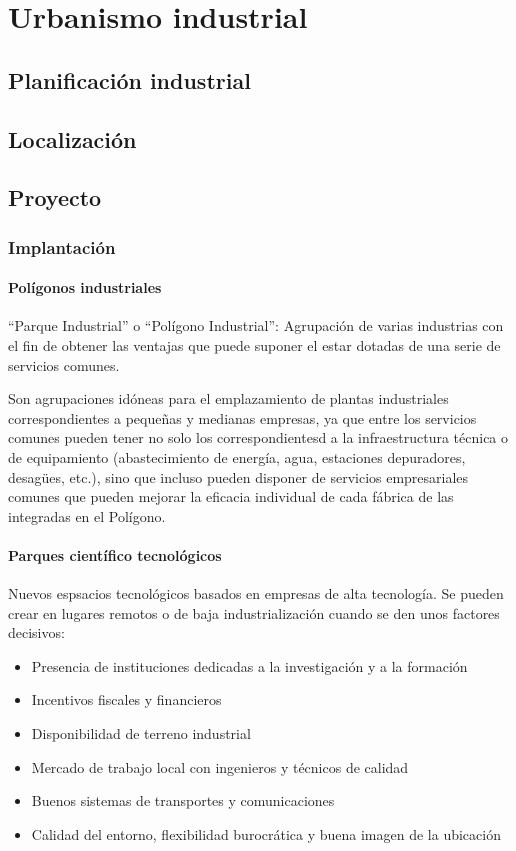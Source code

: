 \chapter{Urbanismo industrial}
\section{Planificación industrial}

\section{Localización}

\section{Proyecto}

\subsection{Implantación}
\subsubsection{Polígonos industriales}
``Parque Industrial'' o ``Polígono Industrial'': Agrupación de varias industrias con el fin de obtener las ventajas que puede suponer el estar dotadas de una serie de servicios comunes.

Son agrupaciones idóneas para el emplazamiento de plantas industriales correspondientes a pequeñas y medianas empresas, ya que entre los servicios comunes pueden tener no solo los correspondientesd a la infraestructura técnica o de equipamiento (abastecimiento de energía, agua, estaciones depuradores, desagües, etc.), sino que incluso pueden disponer de servicios empresariales comunes que pueden mejorar la eficacia individual de cada fábrica de las integradas en el Polígono.

\subsubsection{Parques científico tecnológicos}
Nuevos espsacios tecnológicos basados en empresas de alta tecnología. Se pueden crear en lugares remotos o de baja industrialización cuando se den unos factores decisivos:
\begin{itemize}
    \item Presencia de instituciones dedicadas a la investigación y a la formación
    \item Incentivos fiscales y financieros
    \item Disponibilidad de terreno industrial
    \item Mercado de trabajo local con ingenieros y técnicos de calidad
    \item Buenos sistemas de transportes y comunicaciones
    \item Calidad del entorno, flexibilidad burocrática y buena imagen de la ubicación
\end{itemize}

